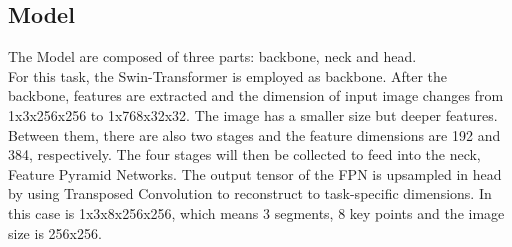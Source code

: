 \subsection{Model}
	The Model are composed of three parts: backbone, neck and head.\\
	For this task, the Swin-Transformer is employed as backbone. After the backbone, features are extracted and the dimension of input image changes 
	from 1x3x256x256 to 1x768x32x32. The image has a smaller size but deeper features.
	Between them, there are also two stages and the feature dimensions are 192 and 384, respectively. 
	The four stages will then be collected to feed into the neck, Feature Pyramid Networks. The output tensor of the FPN is upsampled in head by using
	Transposed Convolution to reconstruct to task-specific dimensions.
	In this case is 1x3x8x256x256, which means 3 segments, 8 key points and the image size is 256x256.
